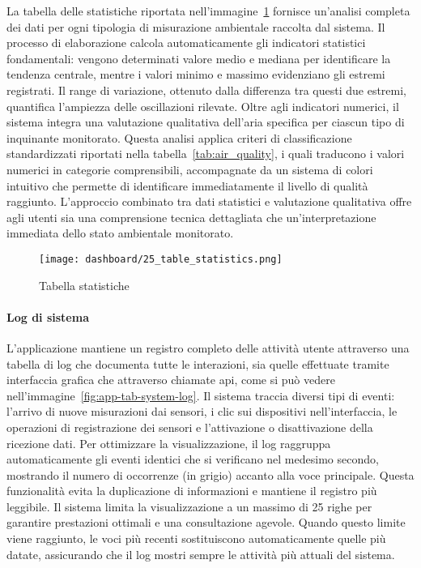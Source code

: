 La tabella delle statistiche riportata nell'immagine~\ref{fig:app-tab-statistics} fornisce un'analisi completa
dei dati per ogni tipologia di misurazione ambientale raccolta dal sistema. Il processo di elaborazione calcola
automaticamente gli indicatori statistici fondamentali: vengono determinati valore medio e mediana
per identificare la tendenza centrale, mentre i valori minimo e massimo evidenziano gli estremi registrati.
Il range di variazione, ottenuto dalla differenza tra questi due estremi, quantifica l'ampiezza
delle oscillazioni rilevate.
Oltre agli indicatori numerici, il sistema integra una valutazione qualitativa dell'aria specifica
per ciascun tipo di inquinante monitorato.
Questa analisi applica criteri di classificazione standardizzati riportati nella tabella~\ref{tab:air_quality},
i quali traducono i valori numerici in categorie comprensibili, accompagnate da un sistema di colori intuitivo
che permette di identificare immediatamente il livello di qualità raggiunto.
L'approccio combinato tra dati statistici e valutazione qualitativa offre agli utenti sia una comprensione
tecnica dettagliata che un'interpretazione immediata dello stato ambientale monitorato.

\begin{figure}[H]
  \centering
  \texttt{[image: dashboard/25\_table\_statistics.png]}
  \caption{Tabella statistiche}
  \label{fig:app-tab-statistics}
\end{figure}

\newpage

\paragraph{Log di sistema}

L'applicazione mantiene un registro completo delle attività utente attraverso una tabella di log che documenta tutte
le interazioni, sia quelle effettuate tramite interfaccia grafica che attraverso chiamate \acrshort{api}, come si
può vedere nell'immagine~\ref{fig:app-tab-system-log}.
Il sistema traccia diversi tipi di eventi: l'arrivo di nuove misurazioni dai sensori, i clic sui dispositivi
nell'interfaccia, le operazioni di registrazione dei sensori e l'attivazione o disattivazione della ricezione dati.
Per ottimizzare la visualizzazione, il log raggruppa automaticamente gli eventi identici che si verificano
nel medesimo secondo, mostrando il numero di occorrenze (in grigio) accanto alla voce principale.
Questa funzionalità evita la duplicazione di informazioni e mantiene il registro più leggibile.
Il sistema limita la visualizzazione a un massimo di 25 righe per garantire prestazioni ottimali e una consultazione
agevole. Quando questo limite viene raggiunto, le voci più recenti sostituiscono automaticamente quelle più datate,
assicurando che il log mostri sempre le attività più attuali del sistema.


